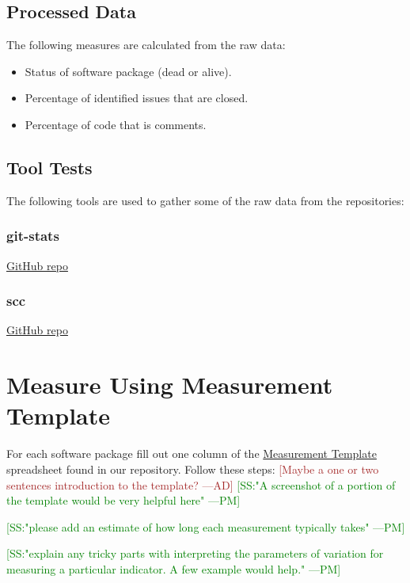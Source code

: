 \documentclass[letterpaper,cleveref]{lipics-v2019}
\newcommand{\authornote}[3]{\textcolor{#1}{[#3 ---#2]}}
\newcommand{\authornote}[3]{}
\newcommand{\pmi}[1]{\authornote{green}{PM}{#1}} %
\newcommand{\ad}[1]{\authornote{brown}{AD}{#1}} %
\theoremstyle{definition}
\begin{document}
\subsection{Processed Data}
The following measures are calculated from the raw data:

\begin{itemize}
\item Status of software package (dead or alive).
\item Percentage of identified issues that are closed.
\item Percentage of code that is comments.
\end{itemize}

\subsection{Tool Tests}
The following tools are used to gather some of the raw data from the repositories:

\subsubsection{git-stats}\label{gitstats}
\href{https://github.com/tomgi/git_stats}{GitHub repo}

\subsubsection{scc}\label{scc}
\href{https://github.com/boyter/scc}{GitHub repo}

\section{Measure Using Measurement Template} \label{SecShallowMeasure}
For each software package fill out one column of the \href{run:Combined_MeasurementTemplate_EmpiricalMeasures.xlsx}{Measurement Template} spreadsheet found in our repository. Follow these steps:
\ad{Maybe a one or two sentences introduction to the template?} \pmi{SS:"A screenshot of a portion of the template would be very helpful here"}

\pmi{SS:"please add an estimate of how long each measurement typically takes"}

\pmi{SS:"explain any tricky parts with interpreting the parameters of variation for measuring a particular indicator. A few example would help."}
\end{document}

